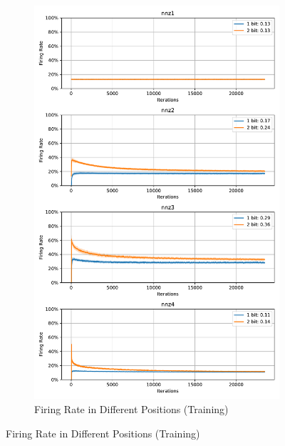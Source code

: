         \begin{figure}[H]
            \centering
            \begin{subfigure}[H]{0.8\textwidth}
                \centering
                \includegraphics[width=\textwidth]{../firerate/MNIST/plots/mnist_train_firerate.pdf}
                \caption{Firing Rate in Different Positions (Training)}
            \end{subfigure}
        \end{figure}
